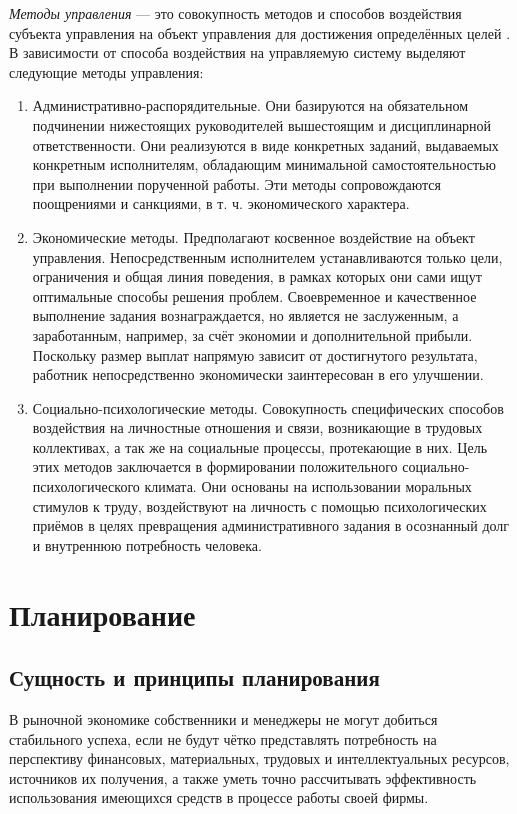\documentclass[12pt, russian, oneside, article]{ncc}
\begin{document}
\emph{Методы управления} --- это совокупность методов и способов воздействия субъекта управления на объект управления для достижения определённых целей . В зависимости от способа воздействия на управляемую систему выделяют следующие методы управления:
\begin{enumerate}
\item Административно-распорядительные. Они базируются на обязательном подчинении нижестоящих руководителей вышестоящим и дисциплинарной ответственности. Они реализуются в виде конкретных заданий, выдаваемых конкретным исполнителям, обладающим минимальной самостоятельностью при выполнении порученной работы. Эти методы сопровождаются поощрениями и санкциями, в т. ч. экономического характера.
\item Экономические методы. Предполагают косвенное воздействие на объект управления. Непосредственным исполнителем устанавливаются только цели,  ограничения и общая линия поведения, в рамках которых они сами ищут оптимальные способы решения проблем. Своевременное и качественное выполнение задания вознаграждается, но является не заслуженным, а заработанным, например, за счёт экономии и дополнительной прибыли. Поскольку размер выплат напрямую зависит от достигнутого результата, работник непосредственно экономически заинтересован в его улучшении.
\item Социально-психологические методы. Совокупность специфических способов воздействия на личностные отношения и связи, возникающие в трудовых коллективах, а так же на социальные процессы, протекающие в них. Цель этих методов заключается в формировании положительного социально-психологического климата. Они основаны на использовании моральных стимулов к труду, воздействуют на личность с помощью психологических приёмов в целях превращения административного задания в осознанный долг и внутреннюю потребность человека.
\end{enumerate}
\section{Планирование}
\label{sec-2}

  
\subsection{Сущность и принципы планирования}
\label{sec-2_1}


В рыночной экономике собственники и менеджеры не могут добиться стабильного успеха, если не будут чётко представлять потребность на перспективу финансовых, материальных, трудовых и интеллектуальных ресурсов, источников их получения, а также уметь точно рассчитывать эффективность использования имеющихся средств в процессе работы своей фирмы.
\end{document}

